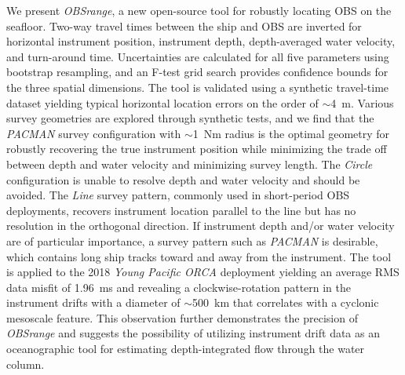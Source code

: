 We present \textit{OBSrange}, a new open-source tool for robustly locating OBS on the seafloor. Two-way travel times between the ship and OBS are inverted for horizontal instrument position, instrument depth, depth-averaged water velocity, and turn-around time. Uncertainties are calculated for all five parameters using bootstrap resampling, and an F-test grid search provides confidence bounds for the three spatial dimensions. The tool is validated using a synthetic travel-time dataset yielding typical horizontal location errors on the order of $\sim$4~m. Various survey geometries are explored through synthetic tests, and we find that the \textit{PACMAN} survey configuration with $\sim$1~Nm radius is the optimal geometry for robustly recovering the true instrument position while minimizing the trade off between depth and water velocity and minimizing survey length. The \textit{Circle} configuration is unable to resolve depth and water velocity and should be avoided. The \textit{Line} survey pattern, commonly used in short-period OBS deployments, recovers instrument location parallel to the line but has no resolution in the orthogonal direction. If instrument depth and/or water velocity are of particular importance, a survey pattern such as \textit{PACMAN} is desirable, which contains long ship tracks toward and away from the instrument. The tool is applied to the 2018 \textit{Young Pacific ORCA} deployment yielding an average RMS data misfit of 1.96~ms and revealing a clockwise-rotation pattern in the instrument drifts with a diameter of $\sim$500~km that correlates with a cyclonic mesoscale feature. This observation further demonstrates the precision of \textit{OBSrange} and suggests the possibility of utilizing instrument drift data as an oceanographic tool for estimating depth-integrated flow through the water column.



